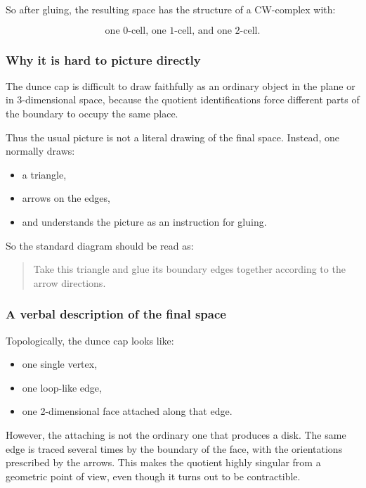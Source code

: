 \documentclass[12pt,a4paper]{article}
\theoremstyle{notespace}
\begin{document}
So after gluing, the resulting space has the structure of a CW-complex with:

\[
\text{one 0-cell, one 1-cell, and one 2-cell.}
\]

\subsubsection{Why it is hard to picture directly}

The dunce cap is difficult to draw faithfully as an ordinary object in the plane or in 3-dimensional space, because the quotient identifications force different parts of the boundary to occupy the same place.

Thus the usual picture is not a literal drawing of the final space. Instead, one normally draws:

\begin{itemize}
	\item a triangle,
	\item arrows on the edges,
	\item and understands the picture as an instruction for gluing.
\end{itemize}

So the standard diagram should be read as:

\begin{quote}
	Take this triangle and glue its boundary edges together according to the arrow directions.
\end{quote}

\subsubsection{A verbal description of the final space}

Topologically, the dunce cap looks like:

\begin{itemize}
	\item one single vertex,
	\item one loop-like edge,
	\item one 2-dimensional face attached along that edge.
\end{itemize}

However, the attaching is not the ordinary one that produces a disk. The same edge is traced several times by the boundary of the face, with the orientations prescribed by the arrows. This makes the quotient highly singular from a geometric point of view, even though it turns out to be contractible.
\end{document}
